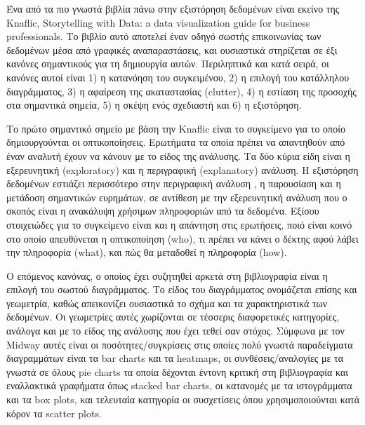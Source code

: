 \documentclass{article}
\begin{document}
Ένα από τα πιο γνωστά βιβλία πάνω στην εξιστόρηση δεδομένων είναι εκείνο της Knaflic, Storytelling with Data: a data visualization guide for business professionals. \cite{knaflic2015storytelling} Το βιβλίο αυτό αποτελεί έναν οδηγό σωστής επικοινωνίας των δεδομένων μέσα από γραφικές αναπαραστάσεις, και ουσιαστικά στηρίζεται σε έξι κανόνες σημαντικούς για τη δημιουργία αυτών. Περιληπτικά και κατά σειρά, οι κανόνες αυτοί είναι 1) η κατανόηση του συγκειμένου, 2) η επιλογή του κατάλληλου διαγράμματος, 3) η αφαίρεση της ακαταστασίας (clutter), 4) η εστίαση της προσοχής στα σημαντικά σημεία, 5) η σκέψη ενός σχεδιαστή και 6) η εξιστόρηση.

Το πρώτο σημαντικό σημείο με βάση την Knaflic είναι το συγκείμενο για το οποίο δημιουργούνται οι οπτικοποίησεις. Ερωτήματα τα οποία πρέπει να απαντηθούν από έναν αναλυτή έχουν να κάνουν με το είδος της ανάλυσης. Τα δύο κύρια είδη είναι η εξερευνητική (exploratory) και η περιγραφική (explanatory) ανάλυση. Η εξιστόρηση δεδομένων εστιάζει περισσότερο στην περιγραφική ανάλυση \cite{echeverria2018exploratory}, η παρουσίαση και η μετάδοση σημαντικών ευρημάτων, σε αντίθεση με την εξερευνητική ανάλυση που ο σκοπός είναι η ανακάλυψη χρήσιμων πληροφοριών από τα δεδομένα. Εξίσου στοιχειώδες για το συγκείμενο είναι και η απάντηση στις ερωτήσεις, ποιό είναι κοινό στο οποίο απευθύνεται η οπτικοποίηση (who), τι πρέπει να κάνει ο δέκτης αφού λάβει την πληροφορία (what), και πώς θα μεταδοθεί η πληροφορία (how). \cite{knaflic2015storytelling}

Ο επόμενος κανόνας, ο οποίος έχει συζητηθεί αρκετά στη βιβλιογραφία είναι η επιλογή του σωστού διαγράμματος. Το είδος του διαγράμματος ονομάζεται επίσης και γεωμετρία, καθώς απεικονίζει ουσιαστικά το σχήμα και τα χαρακτηριστικά των δεδομένων. \cite{midway2020principles} Οι γεωμετρίες αυτές χωρίζονται σε τέσσερις διαφορετικές κατηγορίες, ανάλογα και με το είδος της ανάλυσης που έχει τεθεί σαν στόχος. Σύμφωνα με τον Midway αυτές είναι οι ποσότητες/συγκρίσεις στις οποίες πολύ γνωστά παραδείγματα διαγραμμάτων είναι τα bar charts και τα heatmaps, οι συνθέσεις/αναλογίες με τα γνωστά σε όλους pie charts τα οποία δέχονται έντονη κριτική στη βιβλιογραφία και εναλλακτικά γραφήματα όπως stacked bar charts, οι κατανομές με τα ιστογράμματα και τα box plots, και τελευταία κατηγορία οι συσχετίσεις όπου χρησιμοποιούνται κατά κόρον τα scatter plots.
\end{document}

